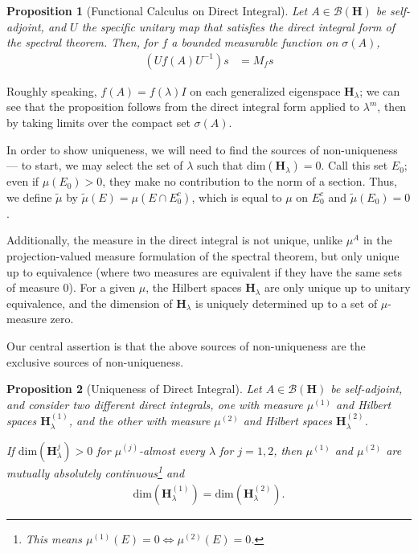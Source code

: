 \documentclass[12pt]{extarticle}
\theoremstyle{plain}
\newtheorem*{proposition}{Proposition}%
\theoremstyle{definition}
\theoremstyle{remark}
\renewcommand{\newline}{\hfill\break}
\begin{document}
  \begin{proposition}[Functional Calculus on Direct Integral]
  Let $A\in \mathcal{B}\left(\mathbf{H}\right)$ be self-adjoint, and $U$ the specific unitary map that satisfies the direct integral form of the spectral theorem. Then, for $f$ a bounded measurable function on $\sigma(A)$,
  \begin{align*}
    \left(Uf(A)U^{-1}\right)s &= M_{f}s
  \end{align*}
  \end{proposition}
  Roughly speaking, $f(A) = f(\lambda)I$ on each generalized eigenspace $\mathbf{H}_{\lambda}$; we can see that the proposition follows from the direct integral form applied to $\lambda^{m}$, then by taking limits over the compact set $\sigma(A)$.\newline

  In order to show uniqueness, we will need to find the sources of non-uniqueness --- to start, we may select the set of $\lambda$ such that $\text{dim}\left(\mathbf{H}_{\lambda}\right) = 0$. Call this set $E_0$; even if $\mu(E_0) > 0$, they make no contribution to the norm of a section. Thus, we define $\tilde{\mu}$ by $\tilde{\mu}(E) = \mu(E\cap E_{0}^{c})$, which is equal to $\mu$ on $E_{0}^{c}$ and $\tilde{\mu}(E_0)= 0$.\newline

  Additionally, the measure in the direct integral is not unique, unlike $\mu^{A}$ in the projection-valued measure formulation of the spectral theorem, but only unique up to equivalence (where two measures are equivalent if they have the same sets of measure $0$). For a given $\mu$, the Hilbert spaces $\mathbf{H}_{\lambda}$ are only unique up to unitary equivalence, and the dimension of $\mathbf{H}_{\lambda}$ is uniquely determined up to a set of $\mu$-measure zero.\newline

  Our central assertion is that the above sources of non-uniqueness are the exclusive sources of non-uniqueness.
  \begin{proposition}[Uniqueness of Direct Integral]
    Let $A\in \mathcal{B}\left(\mathbf{H}\right)$ be self-adjoint, and consider two different direct integrals, one with measure $\mu^{(1)}$ and Hilbert spaces $\mathbf{H}_{\lambda}^{(1)}$, and the other with measure $\mu^{(2)}$ and Hilbert spaces $\mathbf{H}_{\lambda}^{(2)}$.\newline

    If $\text{dim}\left(\mathbf{H}_{\lambda}^{j}\right) > 0$ for $\mu^{(j)}$-almost every $\lambda$ for $j=1,2$, then $\mu^{(1)}$ and $\mu^{(2)}$ are mutually absolutely continuous\footnote{This means $\mu^{(1)}(E) = 0 \Leftrightarrow \mu^{(2)}(E) = 0$.} and
    \begin{align*}
      \text{dim}\left(\mathbf{H}_{\lambda}^{(1)}\right) = \text{dim}\left(\mathbf{H}_{\lambda}^{(2)}\right).
    \end{align*}
  \end{proposition}
\end{document}
